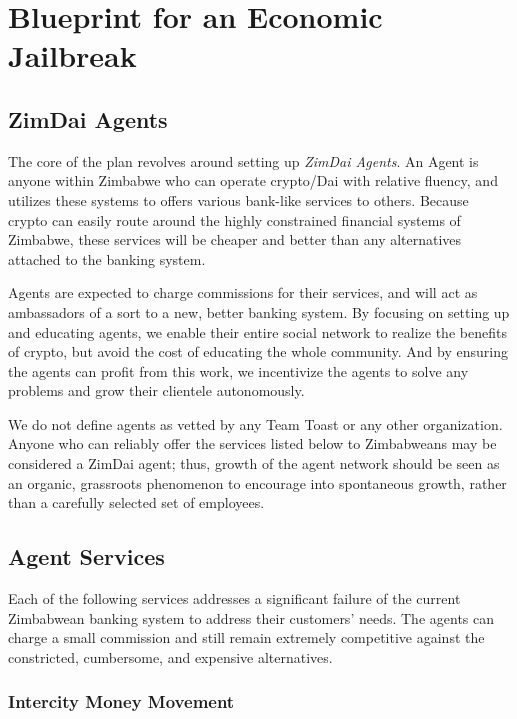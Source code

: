 \documentclass{article}
\begin{document}
\newpage
\section{Blueprint for an Economic Jailbreak}  \label{blueprint}
\subsection{ZimDai Agents} \label{agents}

The core of the plan revolves around setting up \textit{ZimDai Agents}. An Agent is anyone within Zimbabwe who can operate crypto/Dai with relative fluency, and utilizes these systems to offers various bank-like services to others. Because crypto can easily route around the highly constrained financial systems of Zimbabwe, these services will be cheaper and better than any alternatives attached to the banking system.

Agents are expected to charge commissions for their services, and will act as ambassadors of a sort to a new, better banking system. By focusing on setting up and educating agents, we enable their entire social network to realize the benefits of crypto, but avoid the cost of educating the whole community. And by ensuring the agents can profit from this work, we incentivize the agents to solve any problems and grow their clientele autonomously.

We do not define agents as vetted by any Team Toast or any other organization. Anyone who can reliably offer the services listed below to Zimbabweans may be considered a ZimDai agent; thus, growth of the agent network should be seen as an organic, grassroots phenomenon to encourage into spontaneous growth, rather than a carefully selected set of employees.

\subsection{Agent Services} \label{services}

Each of the following services addresses a significant failure of the current Zimbabwean banking system to address their customers' needs. The agents can charge a small commission and still remain extremely competitive against the constricted, cumbersome, and expensive alternatives.

\subsubsection{Intercity Money Movement} \label{intercity}
\end{document}
